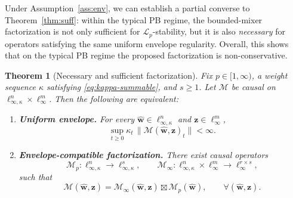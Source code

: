 \documentclass[journal,twoside,web]{ieeecolor}
\newtheorem{theorem}{Theorem}
\newcommand{\disturbance}{\mathbf{\widehat w}}
\newcommand{\operator}{\mathcal{M}}
\begin{document}
Under Assumption~\ref{ass:env}, we can establish a partial converse to
Theorem~\ref{thm:suff}: within the typical PB regime, the bounded-mixer factorization is not only
sufficient for \(\mathcal L_p\)-stability, but it is also \emph{necessary} for operators satisfying the
same uniform envelope regularity. Overall, this shows that on the typical PB regime the proposed
factorization is non-conservative.

\begin{theorem}[Necessary and sufficient factorization]
\label{thm:equiv}
Fix \(p\in[1,\infty)\), a weight sequence \(\kappa\) satisfying \eqref{eq:kappa-summable}, and \(s\ge 1\).
Let \(\operator\) be causal on \(\ell_{\infty,\kappa}^n\times \ell_\infty^m\). Then the following are equivalent:
\begin{enumerate}
\item[\textup{(i)}] \textbf{Uniform envelope.}
For every \(\disturbance\in\ell_{\infty,\kappa}^n\) and \(\mathbf z\in\ell_\infty^m\),
\begin{equation}\label{eq:env-iff}
\sup_{t\ge 0}\kappa_t\,\|\operator(\disturbance,\mathbf z)_t\|<\infty.
\end{equation}

\item[\textup{(ii)}] \textbf{Envelope-compatible factorization.}
There exist causal operators
\[
\operator_p:\ell_{\infty,\kappa}^n\to \ell_{\infty,\kappa}^s,
\qquad
\operator_\infty:\ell_{\infty,\kappa}^n\times \ell_\infty^m
\to \ell_\infty^{r\times s},
\]
such that
\begin{equation}\label{eq:env-factor}
\operator(\disturbance,\mathbf z)
=
\operator_\infty(\disturbance,\mathbf z)\boxtimes \operator_p(\disturbance),
\qquad
\forall(\disturbance,\mathbf z).
\end{equation}
\end{enumerate}
\end{theorem}
\end{document}
